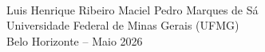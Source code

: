 \begin{center}
    {\Large \textbf{\thetitle}}\\[6pt]

    Luis Henrique Ribeiro Maciel \qquad Pedro Marques de Sá\\[6pt]

    Universidade Federal de Minas Gerais (UFMG)\\[3pt]
    Belo Horizonte -- Maio 2026
\end{center}
